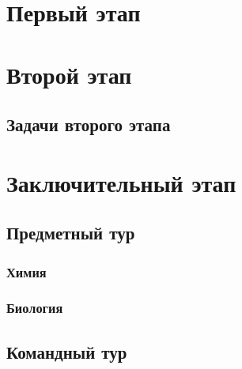 \documentclass[a4paper,12pt,oneside]{book}
\begin{document}
\setcounter{tocdepth}{1}

\tableofcontents

\part{Первый этап}

%
%

\part{Второй этап}
\clearpage
\chapter{Задачи второго этапа}

%

\part{Заключительный этап}

\clearpage
\chapter{Предметный тур}

\section{Химия}
%

\section{Биология}
%

\chapter{Командный тур}

\end{document}
